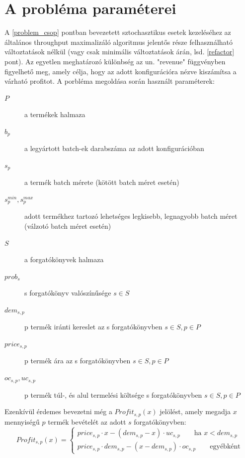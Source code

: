 \section{A probléma paraméterei} \label{problem_parameters}
A \ref{problem_csop} pontban bevezetett sztochasztikus esetek kezeléséhez az általános throughput maximalizáló algoritmus jelentős része felhasználható változtatások nélkül (vagy csak minimális változtatások árán, lsd. \ref{refactor} pont). Az egyetlen meghatározó különbség az un. "revenue" függvényben figyelhető meg, amely célja, hogy az adott konfigurációra nézve kiszámítsa a várható profitot. A porbléma megoldása során használt paraméterek:
\begin {description}
\item[$P$]  a termékek halmaza
\item[$b_p$]  a legyártott batch-ek darabszáma az adott konfigurációban
\item[$s_p$]  a termék batch mérete (kötött batch méret esetén)
\item[$s_p^{min},s_p^{max}$]  adott termékhez tartozó lehetséges legkisebb, legnagyobb batch méret (válzotó batch méret esetén)
\item[$S$]  a forgatókönyvek halmaza
\item[$prob_s$]  s forgatókönyv valószínűsége $s	\in S$
\item[$dem_{s,p}$]  p termék iránti kereslet az s forgatókönyvben $s	\in S, p	\in P$
\item[$price_{s,p}$]  p termék ára az s forgatókönyvben $s	\in S, p	\in P$
\item[$oc_{s,p}, uc_{s,p}$]  p termék túl-, és alul termelési költsége s forgatókönyvben $s	\in S, p	\in P$
\end {description}
Ezenkívül érdemes bevezetni még a $Profit_{s,p}(x)$ jelölést, amely megadja $x$ mennyiségű $p$ termék bevételét az adott $s$ forgatókönyvben:
\begin{equation*}
Profit_{s,p}(x)= \begin{cases}
            price_{s,p}\cdot x-(dem_{s,p}-x) \cdot uc_{s,p}\qquad \text{ha } x<dem_{s,p} \\
            price_{s,p} \cdot dem_{s,p}-(x-dem_{s,p}) \cdot oc_{s,p}\qquad \text{egyébként}
       \end{cases}
\end{equation*}\\
